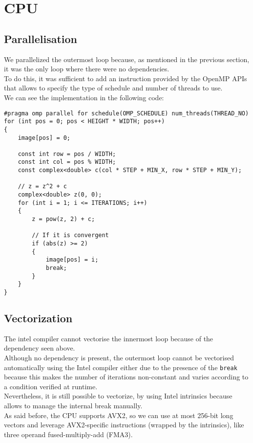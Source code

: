 \documentclass{article}
\begin{document}
\section{CPU}
\subsection{Parallelisation}
We parallelized the outermost loop because, as mentioned in the previous section, it was the only loop where there were no dependencies.\\
To do this, it was sufficient to add an instruction provided by the OpenMP APIs that allows to specify the type of schedule and number of threads to use.\\
We can see the implementation in the following code:
\begin{verbatim}
#pragma omp parallel for schedule(OMP_SCHEDULE) num_threads(THREAD_NO)
for (int pos = 0; pos < HEIGHT * WIDTH; pos++)
{
    image[pos] = 0;

    const int row = pos / WIDTH;
    const int col = pos % WIDTH;
    const complex<double> c(col * STEP + MIN_X, row * STEP + MIN_Y);

    // z = z^2 + c
    complex<double> z(0, 0);
    for (int i = 1; i <= ITERATIONS; i++)
    {
        z = pow(z, 2) + c;

        // If it is convergent
        if (abs(z) >= 2)
        {
            image[pos] = i;
            break;
        }
    }
}
\end{verbatim}

\subsection{Vectorization}
The intel compiler cannot vectorise the innermost loop because of the dependency seen above. \\ 
Although no dependency is present, the outermost loop cannot be vectorised automatically using the Intel compiler either due to the presence of the \texttt{break} because this makes the number of iterations non-constant and varies according to a condition verified at runtime. \\
Nevertheless, it is still possible to vectorize, by using Intel intrinsics because allows to manage the internal break manually. \\ 
As said before, the CPU supports AVX2, so we can use at most 256-bit long vectors and leverage AVX2-specific instructions (wrapped by the intrinsics), like three operand fused-multiply-add (FMA3).
\end{document}
